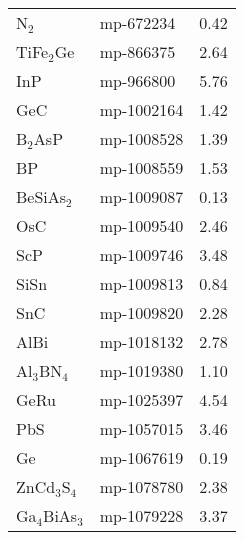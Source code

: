 \begin{center}
\begin{longtable}{M{3.5cm} M{6.5cm} M{2.0cm}}
  N$_2$ & mp-672234 & 0.42\\
  TiFe$_2$Ge & mp-866375 & 2.64\\
  InP & mp-966800 & 5.76\\
  GeC & mp-1002164 & 1.42\\
  B$_2$AsP & mp-1008528 & 1.39\\
  BP & mp-1008559 & 1.53\\
  BeSiAs$_2$ & mp-1009087 & 0.13\\
  OsC & mp-1009540 & 2.46\\
  ScP & mp-1009746 & 3.48\\
  SiSn & mp-1009813 & 0.84\\
  SnC & mp-1009820 & 2.28\\
  AlBi & mp-1018132 & 2.78\\
  Al$_3$BN$_4$ & mp-1019380 & 1.10\\
  GeRu & mp-1025397 & 4.54\\
  PbS & mp-1057015 & 3.46\\
  Ge & mp-1067619 & 0.19\\
  ZnCd$_3$S$_4$ & mp-1078780 & 2.38\\
  Ga$_4$BiAs$_3$ & mp-1079228 & 3.37\\
  \hline
\end{longtable}
\end{center}
